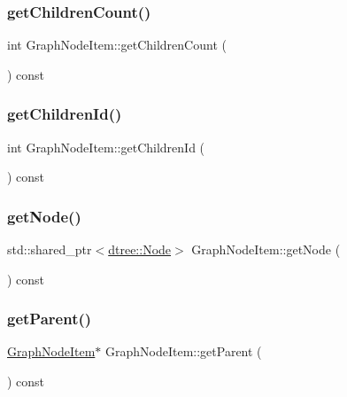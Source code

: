 \subsubsection{\texorpdfstring{getChildrenCount()}{getChildrenCount()}}
{\footnotesize\ttfamily int Graph\+Node\+Item\+::get\+Children\+Count (\begin{DoxyParamCaption}{ }\end{DoxyParamCaption}) const}

\mbox{\label{class_graph_node_item_ac3740a64b8663d7cf84188fd6bd714f7}} 
\subsubsection{\texorpdfstring{getChildrenId()}{getChildrenId()}}
{\footnotesize\ttfamily int Graph\+Node\+Item\+::get\+Children\+Id (\begin{DoxyParamCaption}{ }\end{DoxyParamCaption}) const\hspace{0.3cm}{\ttfamily [inline]}}

\mbox{\label{class_graph_node_item_aabb9309e7f6e14470c786af0e18e0501}} 
\subsubsection{\texorpdfstring{getNode()}{getNode()}}
{\footnotesize\ttfamily std\+::shared\+\_\+ptr$<$\mbox{\hyperlink{classdtree_1_1_node}{dtree\+::\+Node}}$>$ Graph\+Node\+Item\+::get\+Node (\begin{DoxyParamCaption}{ }\end{DoxyParamCaption}) const\hspace{0.3cm}{\ttfamily [inline]}}

\mbox{\label{class_graph_node_item_a15314894ebc8514804988745006a6384}} 
\subsubsection{\texorpdfstring{getParent()}{getParent()}}
{\footnotesize\ttfamily \mbox{\hyperlink{class_graph_node_item}{Graph\+Node\+Item}}$\ast$ Graph\+Node\+Item\+::get\+Parent (\begin{DoxyParamCaption}{ }\end{DoxyParamCaption}) const\hspace{0.3cm}{\ttfamily [inline]}}

